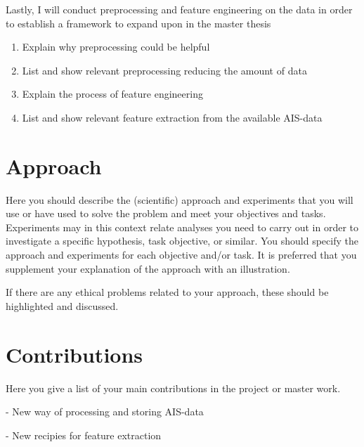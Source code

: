 Lastly, I will conduct preprocessing and feature engineering on the data in order to establish a framework to expand upon in the master thesis
\begin{enumerate}
	\item Explain why preprocessing could be helpful
	\item List and show relevant preprocessing reducing the amount of data
	\item Explain the process of feature engineering
	\item List and show relevant feature extraction from the available AIS-data
\end{enumerate}


\section{Approach}
\label{sec:approach}
\begin{info}
	Here you should describe the (scientific) approach and experiments that you will use or have used to solve the problem and meet your objectives and tasks. Experiments may in this context relate analyses you need to carry out in order to investigate a specific hypothesis, task objective, or similar. You should specify the approach and experiments for each objective and/or task. It is preferred that you supplement your explanation of the approach with an illustration.

	If there are any ethical problems related to your approach, these should be highlighted and discussed.
\end{info}



\section{Contributions}
\label{sec:contributions}
\begin{info}
	Here you give a list of your main contributions in the project or master work.
\end{info}
- New way of processing and storing AIS-data

- New recipies for feature extraction



